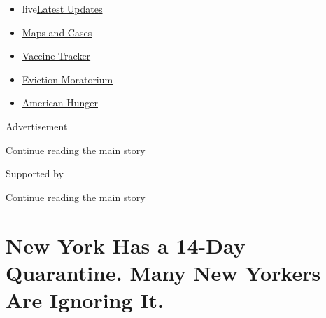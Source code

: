 \begin{itemize}
\tightlist
\item
  live\href{https://www.nytimes3xbfgragh.onion/2020/09/08/world/covid-19-coronavirus.html?name=styln-coronavirus-national\&region=TOP_BANNER\&block=storyline_menu_recirc\&action=click\&pgtype=Article\&impression_id=2b97f5b1-f1c2-11ea-9164-03af42c480ee\&variant=undefined}{Latest
  Updates}
\item
  \href{https://www.nytimes3xbfgragh.onion/interactive/2020/us/coronavirus-us-cases.html?name=styln-coronavirus-national\&region=TOP_BANNER\&block=storyline_menu_recirc\&action=click\&pgtype=Article\&impression_id=2b97f5b2-f1c2-11ea-9164-03af42c480ee\&variant=undefined}{Maps
  and Cases}
\item
  \href{https://www.nytimes3xbfgragh.onion/interactive/2020/science/coronavirus-vaccine-tracker.html?name=styln-coronavirus-national\&region=TOP_BANNER\&block=storyline_menu_recirc\&action=click\&pgtype=Article\&impression_id=2b97f5b3-f1c2-11ea-9164-03af42c480ee\&variant=undefined}{Vaccine
  Tracker}
\item
  \href{https://www.nytimes3xbfgragh.onion/2020/09/02/your-money/eviction-moratorium-covid.html?name=styln-coronavirus-national\&region=TOP_BANNER\&block=storyline_menu_recirc\&action=click\&pgtype=Article\&impression_id=2b97f5b4-f1c2-11ea-9164-03af42c480ee\&variant=undefined}{Eviction
  Moratorium}
\item
  \href{https://www.nytimes3xbfgragh.onion/interactive/2020/09/02/magazine/food-insecurity-hunger-us.html?name=styln-coronavirus-national\&region=TOP_BANNER\&block=storyline_menu_recirc\&action=click\&pgtype=Article\&impression_id=2b97f5b5-f1c2-11ea-9164-03af42c480ee\&variant=undefined}{American
  Hunger}
\end{itemize}

Advertisement

\protect\hyperlink{after-top}{Continue reading the main story}

Supported by

\protect\hyperlink{after-sponsor}{Continue reading the main story}

\hypertarget{new-york-has-a-14-day-quarantine-many-new-yorkers-are-ignoring-it}{%
\section{New York Has a 14-Day Quarantine. Many New Yorkers Are Ignoring
It.}\label{new-york-has-a-14-day-quarantine-many-new-yorkers-are-ignoring-it}}

